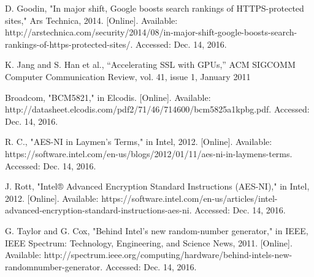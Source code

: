 \documentclass[journal]{IEEEtran}
\begin{document}
\begin{thebibliography}{1}
D. Goodin, "In major shift, Google boosts search rankings of HTTPS-protected sites," Ars Technica, 2014. [Online]. Available: http://arstechnica.com/security/2014/08/in-major-shift-google-boosts-search-rankings-of-https-protected-sites/. Accessed: Dec. 14, 2016.

K. Jang and S. Han et al., “Accelerating SSL with GPUs,” ACM
SIGCOMM Computer Communication Review, vol. 41, issue 1,
January 2011

Broadcom, "BCM5821," in Elcodis. [Online]. Available: http://datasheet.elcodis.com/pdf2/71/46/714600/bcm5825a1kpbg.pdf. Accessed: Dec. 14, 2016.

R. C., "AES-NI in Laymen’s Terms," in Intel, 2012. [Online]. Available: https://software.intel.com/en-us/blogs/2012/01/11/aes-ni-in-laymens-terms. Accessed: Dec. 14, 2016.

J. Rott, "Intel® Advanced Encryption Standard Instructions (AES-NI)," in Intel, 2012. [Online]. Available: https://software.intel.com/en-us/articles/intel-advanced-encryption-standard-instructions-aes-ni. Accessed: Dec. 14, 2016.

G. Taylor and G. Cox, "Behind Intel’s new random-number generator," in IEEE, IEEE Spectrum: Technology, Engineering, and Science News, 2011. [Online]. Available: http://spectrum.ieee.org/computing/hardware/behind-intels-new-randomnumber-generator. Accessed: Dec. 14, 2016.

\end{thebibliography}


\end{document}
